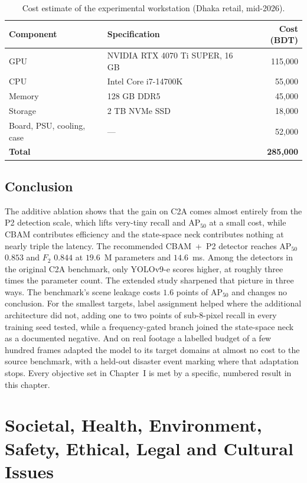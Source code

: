 \documentclass[12pt,a4paper,oneside]{report}
\begin{document}
\begin{table}[tbp]
  \centering
  \caption{Cost estimate of the experimental workstation (Dhaka retail, mid-2026).}
  \label{tab:budget}
  \begin{tabular}{@{}l l r@{}}
    \toprule
    Component & Specification & Cost (BDT) \\
    \midrule
    GPU & NVIDIA RTX 4070 Ti SUPER, 16 GB & 115{,}000 \\
    CPU & Intel Core i7-14700K & 55{,}000 \\
    Memory & 128 GB DDR5 & 45{,}000 \\
    Storage & 2 TB NVMe SSD & 18{,}000 \\
    Board, PSU, cooling, case & --- & 52{,}000 \\
    \midrule
    \textbf{Total} & & \textbf{285{,}000} \\
    \bottomrule
  \end{tabular}
\end{table}

\section{Conclusion}
The additive ablation shows that the gain on C2A comes almost entirely from
the P2 detection scale, which lifts very-tiny recall and $\mathrm{AP}_{50}$
at a small cost, while CBAM contributes efficiency and the state-space neck
contributes nothing at nearly triple the latency. The recommended CBAM~+~P2
detector reaches $\mathrm{AP}_{50}$ $0.853$ and $F_2$ $0.844$ at $19.6$~M
parameters and $14.6$~ms. Among the detectors in the original C2A benchmark,
only YOLOv9-e scores higher, at roughly three times the parameter count. The
extended study sharpened that picture in three ways. The benchmark's scene
leakage costs $1.6$ points of $\mathrm{AP}_{50}$ and changes no conclusion.
For the smallest targets, label assignment helped where the additional
architecture did not, adding one to two points of sub-8-pixel
recall in every training seed tested, while a frequency-gated branch joined
the state-space neck as a documented negative. And on real footage a labelled
budget of a few hundred frames adapted the model to its target domains at
almost no cost to the source benchmark, with a held-out disaster event
marking where that adaptation stops. Every objective set in Chapter~I is met
by a specific, numbered result in this chapter.
 \newpage 
 \newpage \chapter{Societal, Health, Environment, Safety, Ethical, Legal and Cultural Issues}
\end{document}
